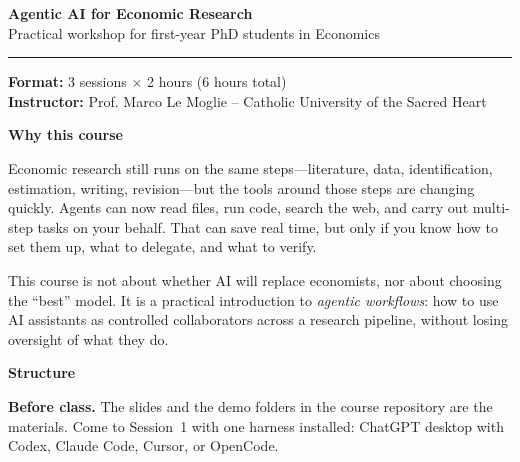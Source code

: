 \documentclass[10pt]{article}
\begin{document}
\thispagestyle{empty}

{\Large\bfseries\color{deepblue} Agentic AI for Economic Research}\\[-0.15em]
{\large Practical workshop for first-year PhD students in Economics}\\[0.25em]
{\color{accent}\rule{\linewidth}{1.2pt}}

\vspace{0.35em}

\textbf{Format:} 3 sessions $\times$ 2 hours (6 hours total) \\
\textbf{Instructor:} Prof. Marco Le Moglie -- Catholic University of the Sacred Heart

\vspace{0.35em}

\textbf{\color{deepblue}Why this course}

Economic research still runs on the same steps---literature, data, identification,
estimation, writing, revision---but the tools around those steps are changing quickly.
Agents can now read files, run code, search the web, and carry out multi-step tasks on
your behalf. That can save real time, but only if you know how to set them up, what to
delegate, and what to verify.

This course is not about whether AI will replace economists, nor about choosing the
``best'' model. It is a practical introduction to \emph{agentic workflows}: how to use
AI assistants as controlled collaborators across a research pipeline, without losing
oversight of what they do.

\vspace{0.2em}

\textbf{\color{deepblue}Structure}

\textbf{Before class.}
The slides and the demo folders in the course repository are the materials.
Come to Session~1 with one harness installed: ChatGPT desktop with Codex, Claude Code,
Cursor, or OpenCode.

\vspace{0.15em}
\end{document}
